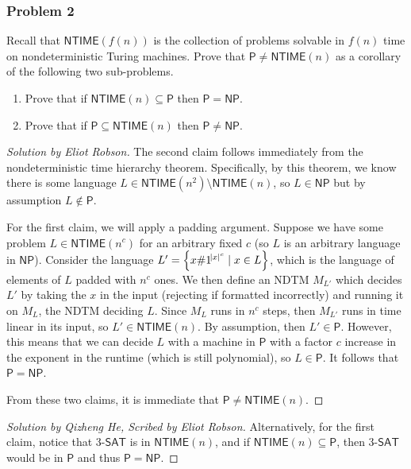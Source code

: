 \documentclass{article}
\newenvironment{solution}[1]{\begin{proof}[Solution by #1]}{\end{proof}}
\newenvironment{scribed}[2]{\begin{proof}[Solution by #1, Scribed by #2]}{\end{proof}}
\newcommand{\NP}{\mathsf{NP}}
\newcommand{\Pe}{\mathsf{P}}
\newcommand{\NTIME}{\mathsf{NTIME}}
\newcommand{\SAT}{\mathsf{SAT}}
\begin{document}
\subsubsection{Problem 2}
Recall that \(\NTIME(f(n))\) is the collection of problems solvable in \(f(n)\) time on nondeterministic Turing machines. Prove that \(\Pe \neq \NTIME(n)\) as a corollary of the following two sub-problems.
\begin{enumerate}
	\item Prove that if \(\NTIME(n) \subseteq \Pe\) then \(\Pe = \NP\).
	
	\item Prove that if \(\Pe \subseteq \NTIME(n)\) then \(\Pe \neq \NP\).
\end{enumerate}

\begin{solution}{Eliot Robson}
	The second claim follows immediately from the nondeterministic time hierarchy theorem. Specifically, by this theorem, we know there is some language \(L \in \NTIME(n^2) \setminus \NTIME(n)\), so \(L \in \NP\) but by assumption \(L \notin \Pe\).
	
	For the first claim, we will apply a padding argument. Suppose we have some problem \(L \in \NTIME(n^c)\) for an arbitrary fixed \(c\) (so \(L\) is an arbitrary language in \(\NP\)). Consider the language \(L' = \set{x \# 1^{\abs{x}^c} \mid x \in L}\), which is the language of elements of \(L\) padded with \(n^c\) ones. We then define an NDTM \(M_{L'}\) which decides \(L'\) by taking the \(x\) in the input (rejecting if formatted incorrectly) and running it on \(M_L\), the NDTM deciding \(L\). Since \(M_L\) runs in \(n^c\) steps, then \(M_{L'}\) runs in time linear in its input, so \(L' \in \NTIME(n)\). By assumption, then \(L' \in \Pe\). However, this means that we can decide \(L\) with a machine in \(\Pe\) with a factor \(c\) increase in the exponent in the runtime (which is still polynomial), so \(L \in \Pe\). It follows that \(\Pe = \NP\).
	
	From these two claims, it is immediate that \(\Pe \neq \NTIME(n)\).
\end{solution}

\begin{scribed}{Qizheng He}{Eliot Robson}
	Alternatively, for the first claim, notice that 3-\(\SAT\) is in \(\NTIME(n)\), and if \(\NTIME(n) \subseteq \Pe\), then 3-\(\SAT\) would be in \(\Pe\) and thus \(\Pe = \NP\).
\end{scribed}
\end{document}
